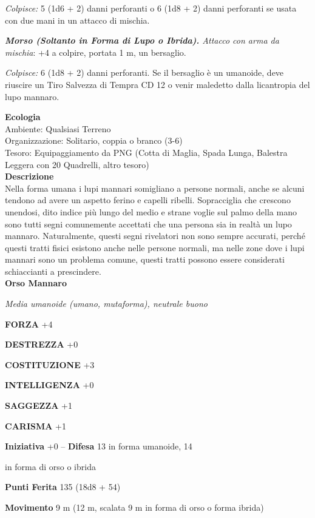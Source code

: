 \begin{multicols}{2}
\emph{Colpisce:} 5 (1d6 + 2) danni perforanti o 6 (1d8 + 2) danni perforanti se usata con due mani in un attacco di mischia.

\emph{\textbf{Morso (Soltanto in Forma di Lupo o Ibrida).} Attacco con arma da mischia}: +4 a colpire, portata 1 m, un bersaglio.

\emph{Colpisce:} 6 (1d8 + 2) danni perforanti. Se il bersaglio è un umanoide, deve riuscire un Tiro Salvezza di Tempra CD 12 o venir maledetto dalla licantropia del lupo mannaro.

\textbf{Ecologia}\\
Ambiente: Qualsiasi Terreno\\
Organizzazione: Solitario, coppia o branco (3-6)\\
Tesoro: Equipaggiamento da PNG (Cotta di Maglia, Spada Lunga, Balestra Leggera con 20 Quadrelli, altro tesoro)\\
\textbf{Descrizione}\\
Nella forma umana i lupi mannari somigliano a persone normali, anche se alcuni tendono ad avere un aspetto ferino e capelli ribelli. Sopracciglia che crescono unendosi, dito indice più lungo del medio e strane voglie sul palmo della mano sono tutti segni comunemente accettati che una persona sia in realtà un lupo mannaro. Naturalmente, questi segni rivelatori non sono sempre accurati, perché questi tratti fisici esistono anche nelle persone normali, ma nelle zone dove i lupi mannari sono un problema comune, questi tratti possono essere considerati schiaccianti a prescindere.\\


\medskip{}\textbf{Orso Mannaro}

\emph{Media umanoide (umano, mutaforma), neutrale buono}

\textbf{FORZA} +4

\textbf{DESTREZZA} +0

\textbf{COSTITUZIONE} +3

\textbf{INTELLIGENZA} +0

\textbf{SAGGEZZA} +1

\textbf{CARISMA} +1

\textbf{Iniziativa} +0 -- \textbf{Difesa} 13 in forma umanoide, 14

in forma di orso o ibrida

\textbf{Punti Ferita} 135 (18d8 + 54)

\textbf{Movimento} 9 m (12 m, scalata 9 m in forma di orso o forma ibrida)


\end{multicols}
